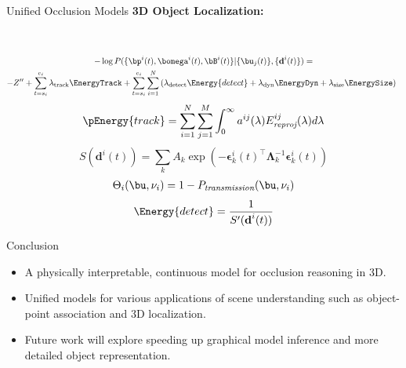 \documentclass[handout,final]{beamer}
\newcommand{\Ptransmission}{P_{\textit{transmission}}}%
\newcommand{\bepsilon}{{\bm{\epsilon}}}
\newcommand{\meandepth}[1]{\nu_#1}
\newcommand{\bLambda}{\bm{\Lambda}}
\newlength{\onecolwid}
\begin{document}
\begin{frame}[t]
\begin{columns}[t]
\begin{column}{\onecolwid}
\begin{block}{Unified Occlusion Models}
	  \textbf{3D Object Localization:}
		\begin{figure}
			\newcommand{\imagewidth}{17cm}
		     \\
		            
        \end{figure}	
        \begin{multline*}
          -\log{P(\{ \bp^i(t) , \bomega^i(t) , \bB^i(t) \} | \{\bu_j(t)\} , \{\textbf{d}^i(t)\} )} = \\
          -Z'' 
          + \sum_{t=s_i}^{e_i} \lambda_{\text{track}}\EnergyTrack
          +  
          \sum_{t=s_i}^{e_i} \sum_{i=1}^N  
          \left(
            \lambda_{\text{detect}}\Energy{detect}
            + \lambda_{\text{dyn}}\EnergyDyn    
            + \lambda_{\text{size}}\EnergySize
          \right)
          \enspace
        \end{multline*}        
        \begin{align}
		  \pEnergy{track} = \sum_{i=1}^{N} \sum_{j = 1}^{M} \int_0^\infty a^{ij}(\lambda) E^{ij}_{\textit{reproj}}(\lambda) d\lambda
		\end{align}        
        \begin{equation}
			S(\textbf{d}^i(t)) = \sum_k A_k \exp \left( -\bepsilon_k^{i}(t)^\top \bLambda_k^{-1} \bepsilon_k^{i}(t) \right)
		\end{equation}		
		\begin{align}
		  \Theta_{i}(\bu, \meandepth{i}) = 1 - \Ptransmission(\bu, \meandepth{i})
		\end{align}		
		\begin{align}
		  \Energy{detect} = \frac{1}{S'(\textbf{d}^i(t))}
		\end{align}
        
                

      \end{block}
      \begin{block}{Conclusion}
        \begin{itemize}
          \item A physically interpretable, continuous model for occlusion reasoning in 3D.
          \item Unified models for various applications of scene understanding such as object-point association and 3D localization.
          \item Future work will explore speeding up graphical model inference and more detailed object representation.
        \end{itemize}
      \end{block}


\end{column}
\end{columns}
\end{frame}
\end{document}
